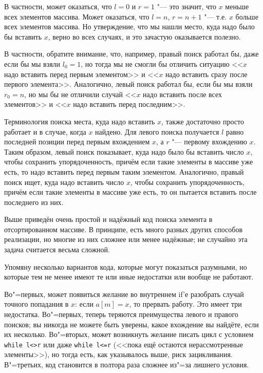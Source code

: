 В частности, может оказаться, что $l=0$ и $r=1$ "--- это значит, что $x$ меньше всех элементов массива.
Может оказаться, что $l=n$, $r=n+1$ "--- т.е. $x$ больше всех элементов массива.
Но утверждение, что мы нашли место, куда надо было бы вставить $x$, верно во всех случаях, 
и это зачастую оказывается полезно.

В частности, обратите внимание, что, например, правый поиск работал бы, даже если бы мы взяли $l_0=1$, 
но тогда мы не смогли бы отличить ситуацию <<$x$ надо вставить перед первым элементом>> 
и <<$x$ надо вставить сразу после первого элемента>>.
Аналогично, левый поиск работал бы, если бы мы взяли $r_0=n$, но мы бы не отличили 
случай <<$x$ надо вставить после всех элементов>> и <<$x$ надо вставить перед последним>>.

Терминология поиска места, куда надо вставить $x$, также достаточно просто
работает и в случае, когда $x$ найдено.
Для левого поиска получается $l$ равно последней позиции перед первым вхождением $x$,
а $r$ "--- первому вхождению $x$. 
Таким образом, левый поиск показывает, куда надо было бы вставить число $x$,
чтобы сохранить упорядоченность, причём если такие элементы в массиве уже есть,
то надо вставить перед первым таким элементом.
Аналогично, правый поиск ищет, куда надо вставить число $x$, чтобы сохранить упорядоченность,
причём если такие элементы в массиве уже есть, то он пытается вставить после последнего из них.

Выше приведён очень простой и надёжный код поиска элемента в отсортированном массиве.
В принципе, есть много разных других способов реализации, но многие из них сложнее
или менее надёжные; не случайно эта задача считается весьма сложной.

Упомяну несколько вариантов кода, которые могут показаться разумными, но которые тем не менее 
имеют те или иные недостатки или вообще не работают.

Во"=первых, может появиться желание во внутреннем if'е разобрать случай точного попадания в $x$:
если $a[m]=x$, то прервать работу. Это имеет три недостатка. 
Во"=первых, теперь теряются преимущества левого и правого поисков; вы никогда не можете
быть уверены, какое вхождение вы найдёте, если их несколько.
Во"=вторых, может возникнуть желание писать цикл с условием \verb`while l<>r` или даже
\verb`while l<=r` (<<пока ещё остаются нерассмотренные элементы>>), 
но тогда есть, как указывалось выше, риск зацикливания.
В"=третьих, код становится в полтора раза сложнее из"=за лишнего условия.

